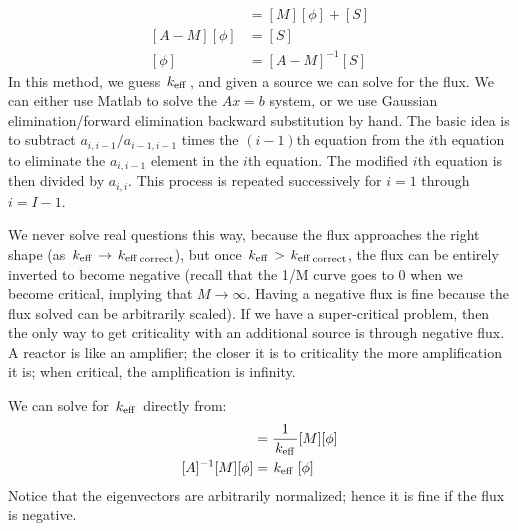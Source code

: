 \documentclass{school-22.211-notes}
\begin{document}
\begin{align}
[A] [\phi] &= [M] [\phi] + [S] \\
[A - M ] [\phi] &= [S] \\
[\phi] &= [A - M]^{-1} [S]
\end{align}
In this method, we guess $\left. k_{\mathrm{eff}} \right.$, and given a source we can solve for the flux. We can either use Matlab to solve the $Ax = b$ system, or we use Gaussian elimination/forward elimination backward substitution by hand. The basic idea is to subtract $a_{i,i-1}/a_{i-1,i-1}$ times the $(i-1)$th equation from the $i$th equation to eliminate the $a_{i,i-1}$ element in the $i$th equation. The modified $i$th equation is then divided by $a_{i,i}$. This process is repeated successively for $i=1$ through $i = I-1$. 

We never solve real questions this way, because the flux approaches the right shape (as $\left. k_{\mathrm{eff}} \right. \to \left. k_{\mathrm{eff}} \right._{\mathrm{correct}}$), but once $\left. k_{\mathrm{eff}} \right. > \left. k_{\mathrm{eff}} \right._{\mathrm{correct}}$, the flux can be entirely inverted to become negative (recall that the 1/M curve goes to 0 when we become critical, implying that $M \to \infty$. Having a negative flux is fine because the flux solved can be arbitrarily scaled). If we have a super-critical problem, then the only way to get criticality with an additional source is through negative flux. A reactor is like an amplifier; the closer it is to criticality the more amplification it is; when critical, the amplification is infinity. 


We can solve for $\left. k_{\mathrm{eff}} \right.$ directly from: 
\begin{align}
[A] [\phi] &= \frac{1}{\keff} [M] [\phi] \\
[A]^{-1} [M] [\phi] &= \keff [\phi]
\end{align}
Notice that the eigenvectors are arbitrarily normalized; hence it is fine if the flux is negative. 
\end{document}
